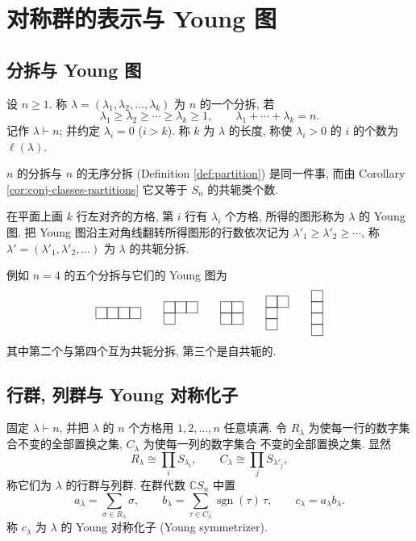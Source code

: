 \newcommand{\young}[1]{%
  \begin{tikzpicture}[x=10pt,y=10pt,baseline=(current bounding box.center),line width=0.4pt]
    \foreach \len [count=\i from 0] in {#1}{%
      \foreach \j in {1,...,\len}{%
        \draw (\j-1,-\i) rectangle (\j,-\i-1);}}
  \end{tikzpicture}}
\section{对称群的表示与 Young 图}

\subsection{分拆与 Young 图}

\begin{definition}[分拆]\label{def:app-partition}
设 $n\ge1$. 称 $\lambda=(\lambda_1,\lambda_2,\dots,\lambda_k)$ 为 $n$ 的一个分拆, 若
\[
  \lambda_1\ge\lambda_2\ge\cdots\ge\lambda_k\ge1,\qquad \lambda_1+\cdots+\lambda_k=n .
\]
记作 $\lambda\vdash n$; 并约定 $\lambda_{i}=0$ ($i>k$). 称 $k$ 为 $\lambda$ 的长度,
称使 $\lambda_i>0$ 的 $i$ 的个数为 $\ell(\lambda)$.
\end{definition}

$n$ 的分拆与 $n$ 的无序分拆 (Definition \ref{def:partition}) 是同一件事, 而由
Corollary \ref{cor:conj-classes-partitions} 它又等于 $S_n$ 的共轭类个数.

\begin{definition}[Young 图]\label{def:young-diagram}
在平面上画 $k$ 行左对齐的方格, 第 $i$ 行有 $\lambda_i$ 个方格, 所得的图形称为
$\lambda$ 的 Young 图. 把 Young 图沿主对角线翻转所得图形的行数依次记为
$\lambda'_1\ge\lambda'_2\ge\cdots$, 称 $\lambda'=(\lambda'_1,\lambda'_2,\dots)$ 为 $\lambda$
的共轭分拆.
\end{definition}

例如 $n=4$ 的五个分拆与它们的 Young 图为
\[
  \young{4}\qquad \young{3,1}\qquad \young{2,2}\qquad \young{2,1,1}\qquad \young{1,1,1,1}
\]
其中第二个与第四个互为共轭分拆, 第三个是自共轭的.

\subsection{行群, 列群与 Young 对称化子}

固定 $\lambda\vdash n$, 并把 $\lambda$ 的 $n$ 个方格用 $1,2,\dots,n$ 任意填满.
令 $R_\lambda$ 为使每一行的数字集合不变的全部置换之集, $C_\lambda$ 为使每一列的数字集合
不变的全部置换之集. 显然
\[
  R_\lambda\cong\prod_i S_{\lambda_i},\qquad
  C_\lambda\cong\prod_j S_{\lambda'_j},
\]
称它们为 $\lambda$ 的行群与列群. 在群代数 $\mathbb{C}S_n$ 中置
\[
  a_\lambda=\sum_{\sigma\in R_\lambda}\sigma,\qquad
  b_\lambda=\sum_{\tau\in C_\lambda}\operatorname{sgn}(\tau)\,\tau,\qquad
  c_\lambda=a_\lambda b_\lambda .
\]
称 $c_\lambda$ 为 $\lambda$ 的 Young 对称化子 (Young symmetrizer).

